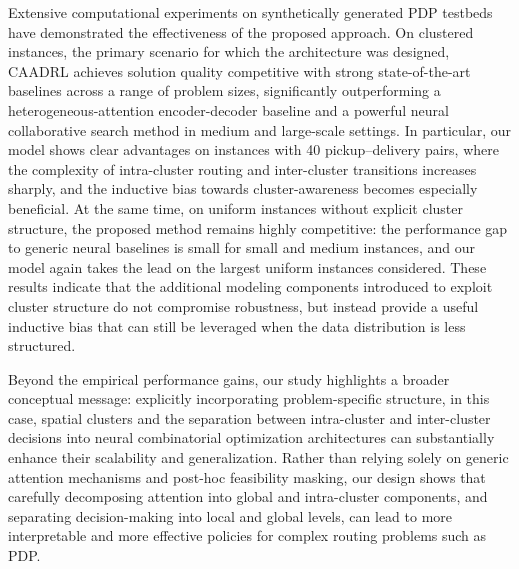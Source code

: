 \documentclass[pdflatex,sn-basic,Numbered]{sn-jnl}
\begin{document}
Extensive computational experiments on synthetically generated PDP testbeds have demonstrated the effectiveness of the proposed approach. On clustered instances, the primary scenario for which the architecture was designed, CAADRL achieves solution quality competitive with strong state-of-the-art baselines across a range of problem sizes, significantly outperforming a heterogeneous-attention encoder-decoder baseline and a powerful neural collaborative search method in medium and large-scale settings. In particular, our model shows clear advantages on instances with 40 pickup--delivery pairs, where the complexity of intra-cluster routing and inter-cluster transitions increases sharply, and the inductive bias towards cluster-awareness becomes especially beneficial. At the same time, on uniform instances without explicit cluster structure, the proposed method remains highly competitive: the performance gap to generic neural baselines is small for small and medium instances, and our model again takes the lead on the largest uniform instances considered. These results indicate that the additional modeling components introduced to exploit cluster structure do not compromise robustness, but instead provide a useful inductive bias that can still be leveraged when the data distribution is less structured.

Beyond the empirical performance gains, our study highlights a broader conceptual message: explicitly incorporating problem-specific structure, in this case, spatial clusters and the separation between intra-cluster and inter-cluster decisions into neural combinatorial optimization architectures can substantially enhance their scalability and generalization. Rather than relying solely on generic attention mechanisms and post-hoc feasibility masking, our design shows that carefully decomposing attention into global and intra-cluster components, and separating decision-making into local and global levels, can lead to more interpretable and more effective policies for complex routing problems such as PDP.
\end{document}
